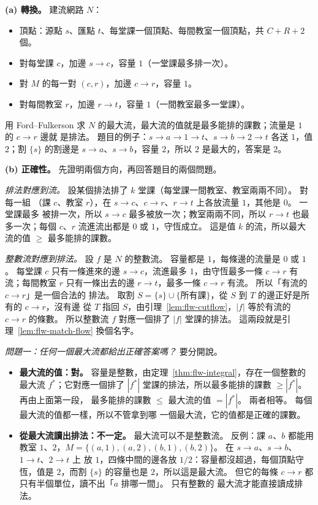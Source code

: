 \textbf{(a) 轉換。} 建流網路 $N$：
\begin{itemize}
\item 頂點：源點 $s$、匯點 $t$、每堂課一個頂點、每間教室一個頂點，共 $C + R + 2$ 個。
\item 對每堂課 $c$，加邊 $s \to c$，容量 $1$（一堂課最多排一次）。
\item 對 $M$ 的每一對 $(c, r)$，加邊 $c \to r$，容量 $1$。
\item 對每間教室 $r$，加邊 $r \to t$，容量 $1$（一間教室最多一堂課）。
\end{itemize}
用 Ford--Fulkerson 求 $N$ 的最大流，最大流的值就是最多能排的課數；流量是 $1$ 的 $c \to r$ 邊就
是排法。 題目的例子：$s \to a \to 1 \to t$、$s \to b \to 2 \to t$ 各送 $1$，值 $2$；割
$\{s\}$ 的割邊是 $s \to a$、$s \to b$，容量 $2$，所以 $2$ 是最大的，答案是 $2$。

\textbf{(b) 正確性。} 先證明兩個方向，再回答題目的兩個問題。

\emph{排法對應到流。} 設某個排法排了 $k$ 堂課（每堂課一間教室、教室兩兩不同）。 對每一組
（課 $c$、教室 $r$），在 $s \to c$、$c \to r$、$r \to t$ 上各放流量 $1$，其他是 $0$。 一堂課最多
被排一次，所以 $s \to c$ 最多被放一次；教室兩兩不同，所以 $r \to t$ 也最多一次；每個 $c$、$r$
流進流出都是 $0$ 或 $1$，守恆成立。 這是值 $k$ 的流，所以最大流的值 $\ge$ 最多能排的課數。

\emph{整數流對應到排法。} 設 $f$ 是 $N$ 的整數流。 容量都是 $1$，每條邊的流量是 $0$ 或 $1$。
每堂課 $c$ 只有一條進來的邊 $s \to c$，流進最多 $1$，由守恆最多一條 $c \to r$ 有流；每間教室
$r$ 只有一條出去的邊 $r \to t$，最多一條 $c \to r$ 有流。 所以「有流的 $c \to r$」是一個合法的
排法。 取割 $S = \{s\} \cup \{\text{所有課}\}$，從 $S$ 到 $T$ 的邊正好是所有的 $c \to r$，沒有邊
從 $T$ 指回 $S$，由引理~\ref{lem:flw-cutflow}，$|f|$ 等於有流的 $c \to r$ 的條數。 所以整數流
$f$ 對應一個排了 $|f|$ 堂課的排法。 這兩段就是引理~\ref{lem:flw-match-flow} 換個名字。

\emph{問題一：任何一個最大流都給出正確答案嗎？} 要分開說。
\begin{itemize}
\item \textbf{最大流的值：對。} 容量是整數，由定理~\ref{thm:flw-integral}，存在一個整數的最大流
$f^{*}$；它對應一個排了 $|f^{*}|$ 堂課的排法，所以最多能排的課數 $\ge |f^{*}|$。 再由上面第一段，
最多能排的課數 $\le$ 最大流的值 $= |f^{*}|$。 兩者相等。 每個最大流的值都一樣，所以不管拿到哪
一個最大流，它的值都是正確的課數。
\item \textbf{從最大流讀出排法：不一定。} 最大流可以不是整數流。 反例：課 $a$、$b$ 都能用教室
$1$、$2$，$M = \{(a, 1), (a, 2), (b, 1), (b, 2)\}$。 在 $s \to a$、$s \to b$、$1 \to t$、$2 \to t$ 上
放 $1$，四條中間的邊各放 $1/2$：容量都沒超過，每個頂點守恆，值是 $2$，而割 $\{s\}$ 的容量也是
$2$，所以這是最大流。 但它的每條 $c \to r$ 都只有半個單位，讀不出「$a$ 排哪一間」。 只有整數的
最大流才能直接讀成排法。
\end{itemize}

